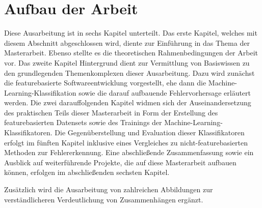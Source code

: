 \section{Aufbau der Arbeit}

Diese Ausarbeitung ist in sechs Kapitel unterteilt. Das erste Kapitel, welches mit diesem Abschnitt abgeschlossen wird, diente zur Einführung in das Thema der Masterarbeit. Ebenso stellte es die theoretischen Rahmenbedingungen der Arbeit vor. Das zweite Kapitel \glqq Hintergrund\grqq{} dient zur Vermittlung von Basiswissen zu den grundlegenden Themenkomplexen dieser Ausarbeitung. Dazu wird zunächst die featurebasierte Softwareentwicklung vorgestellt, ehe dann die Machine-Learning-Klassifikation sowie die darauf aufbauende Fehlervorhersage erläutert werden. Die zwei darauffolgenden Kapitel widmen sich der Auseinandersetzung des praktischen Teils dieser Masterarbeit in Form der Erstellung des featurebasierten Datensets sowie des Trainings der Machine-Learning-Klassifikatoren. Die Gegenüberstellung und Evaluation dieser Klassifikatoren erfolgt im fünften Kapitel inklusive eines Vergleiches zu nicht-featurebasierten Methoden zur Fehlererkennung. Eine abschließende Zusammenfassung sowie ein Ausblick auf weiterführende Projekte, die auf diese Masterarbeit aufbauen können, erfolgen im abschließenden sechsten Kapitel.

Zusätzlich wird die Ausarbeitung von zahlreichen Abbildungen zur verständlicheren Verdeutlichung von Zusammenhängen ergänzt.

\cleardoublepage

